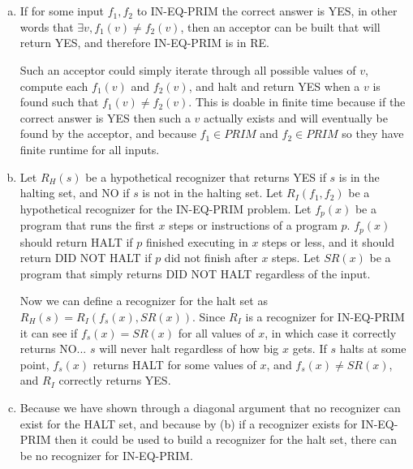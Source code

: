 \documentclass{article}
\begin{document}
\section{}
\begin{enumerate}[(a)]
\item
If for some input $f_1,f_2$ to IN-EQ-PRIM the correct answer is YES, in other
words that
$\exists v, f_1(v) \ne f_2(v)$, then an acceptor can be built that will return
YES, and therefore IN-EQ-PRIM is in RE. 

\vspace{1em}

Such an acceptor could simply
iterate through all possible values of $v$, compute each $f_1(v)$ and $f_2(v)$,
and halt and return YES when a $v$ is found such that $f_1(v) \ne f_2(v)$. This
is doable in finite time because if the correct answer is YES then
such a $v$ actually exists and will eventually be found by the acceptor,
and because $f_1 \in PRIM$ and $f_2 \in PRIM$ so they have finite runtime for
all inputs.

\item
Let $R_H(s)$ be a hypothetical recognizer that returns YES if $s$ is in the
halting set, and NO if $s$ is not in the halting set. Let $R_I(f_1, f_2)$ be a
hypothetical recognizer for the IN-EQ-PRIM problem. Let $f_p(x)$ be a program
that runs the first $x$ steps or instructions of a program $p$. $f_p(x)$ should
return HALT if $p$ finished executing in $x$ steps or less, and it should
return DID NOT HALT if $p$ did not finish after $x$ steps. Let $SR(x)$ be a
program that simply returns DID NOT HALT regardless of the input.

\vspace{1em}

Now we can define a recognizer for the halt set as
$R_H(s) = R_I(f_s(x), SR(x))$.
Since $R_I$ is a recognizer for IN-EQ-PRIM it can see if
$f_s(x) = SR(x)$ for all values of $x$, in which case it correctly returns 
NO... $s$ will never halt regardless of how big $x$ gets. If $s$ halts at some
point, $f_s(x)$ returns HALT for some values of $x$, and $f_s(x) \ne SR(x)$,
and $R_I$ correctly returns YES.

\item
Because we have shown through a diagonal argument that no recognizer can exist
for the HALT set, and because by (b) if a recognizer exists for IN-EQ-PRIM
then it could be used
to build a recognizer for the halt set, there can be no recognizer for
IN-EQ-PRIM.
\end{enumerate}
\end{document}
